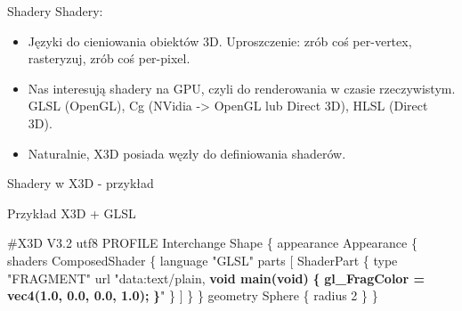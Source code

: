 \documentclass{beamer}
\begin{document}
\begin{frame}{Shadery}
Shadery:
\begin{itemize}
  \item Języki do cieniowania obiektów 3D. Uproszczenie: zrób coś per-vertex,
    rasteryzuj, zrób coś per-pixel.
  \item Nas interesują shadery na GPU, czyli do renderowania w czasie
    rzeczywistym. GLSL (OpenGL), Cg (NVidia -> OpenGL lub Direct 3D),
    HLSL (Direct 3D).
  \item Naturalnie, X3D posiada węzły do definiowania shaderów.
\end{itemize}
\end{frame}

\begin{frame}[fragile]{Shadery w X3D - przykład}
\begin{exampleblock}{Przykład X3D + GLSL}
\begin{semiverbatim}
\#X3D V3.2 utf8
PROFILE Interchange
Shape \{
  appearance Appearance \{ shaders ComposedShader \{
    language "GLSL"
    parts [
      ShaderPart \{ type "FRAGMENT"
        url "data:text/plain,
        \textbf{void main(void)}
        \textbf{\{}
          \textbf{gl\_FragColor = vec4(1.0, 0.0, 0.0, 1.0);}
        \textbf{\}}" \}
    ]
  \} \}
  geometry Sphere \{ radius 2 \}
\}
\end{semiverbatim}
\end{exampleblock}
\end{frame}
\end{document}
